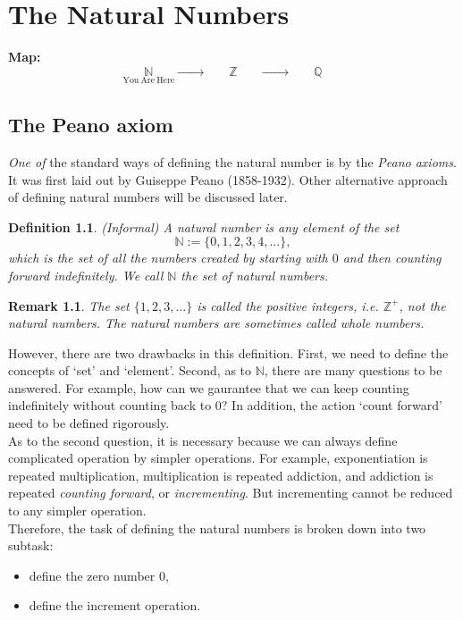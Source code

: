 \documentclass[a4paper]{book}
\newtheorem{definition}{Definition}[section]
\newtheorem{remark}{Remark}[section]
\begin{document}
	\chapter{The Natural Numbers}
		\label{The Natural Numbers}
		\textbf{Map:}
		\begin{equation*}
			\underset{\mathrm{You~Are~Here}}{\mathbb{N}} \xrightarrow{\quad \quad\quad}\underset{\mathrm{\phantom{\mathrm{You~Are~Here}}}}{\mathbb{Z}}\xrightarrow{\quad\quad\quad}\underset{\mathrm{\phantom{\mathrm{You~Are~Here}}}}{\mathbb{Q}}
		\end{equation*}
		\section{The Peano axiom}
			\textit{One of} the standard ways of defining the natural number is by the \textit{Peano axioms}. It was first laid out by Guiseppe Peano (1858-1932). Other alternative approach of defining natural numbers will be discussed later.
			\begin{definition}
				(Informal) A \textit{natural number} is any element of the set $$\mathbb{N} := \{0,1,2,3,4,...\},$$ which is the set of all the numbers created by starting with $0$ and then counting forward indefinitely. We call $\mathbb{N}$ the \textit{set of natural numbers}.
			\end{definition}
			\begin{remark}
				The set $\{1,2,3,...\}$ is called \textit{the positive integers}, i.e. ${\mathbb{Z}}^{+}$, not the natural numbers. The natural numbers are sometimes called \textit{whole numbers}.
			\end{remark}
			However, there are two drawbacks in this definition. First, we need to define the concepts of `set' and `element'. Second, as to $\mathbb{N}$, there are many questions to be answered. For example, how can we gaurantee that we can keep counting indefinitely without counting back to $0$? In addition, the action `count forward' need to be defined rigorously.\\
			As to the second question, it is necessary because we can always define complicated operation by simpler operations. For example, exponentiation is repeated multiplication, multiplication is repeated addiction, and addiction is repeated \textit{counting forward}, or \textit{incrementing}. But incrementing cannot be reduced to any simpler operation.\\
			Therefore, the task of defining the natural numbers is broken down into two subtask:
			\begin{itemize}
				\item define the zero number $0$,
				\item define the increment operation.
			\end{itemize}
\end{document}
